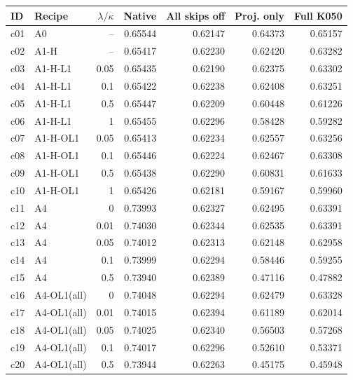 \begin{tabular}{@{}llrrrrr@{}}
\toprule
ID & Recipe & $\lambda/\kappa$ & Native & All skips off & Proj. only & Full K050 \\
\midrule
c01 & A0 & -- & 0.65544 & 0.62147 & 0.64373 & 0.65157 \\
\addlinespace[2pt]
c02 & A1-H & -- & 0.65417 & 0.62230 & 0.62420 & 0.63282 \\
\addlinespace[2pt]
c03 & A1-H-L1 & 0.05 & 0.65435 & 0.62190 & 0.62375 & 0.63302 \\
c04 & A1-H-L1 & 0.1 & 0.65422 & 0.62238 & 0.62408 & 0.63251 \\
c05 & A1-H-L1 & 0.5 & 0.65447 & 0.62209 & 0.60448 & 0.61226 \\
c06 & A1-H-L1 & 1 & 0.65455 & 0.62296 & 0.58428 & 0.59282 \\
\addlinespace[2pt]
c07 & A1-H-OL1 & 0.05 & 0.65413 & 0.62234 & 0.62557 & 0.63256 \\
c08 & A1-H-OL1 & 0.1 & 0.65446 & 0.62224 & 0.62467 & 0.63308 \\
c09 & A1-H-OL1 & 0.5 & 0.65438 & 0.62290 & 0.60831 & 0.61633 \\
c10 & A1-H-OL1 & 1 & 0.65426 & 0.62181 & 0.59167 & 0.59960 \\
\addlinespace[2pt]
c11 & A4 & 0 & 0.73993 & 0.62327 & 0.62495 & 0.63391 \\
c12 & A4 & 0.01 & 0.74030 & 0.62344 & 0.62535 & 0.63391 \\
c13 & A4 & 0.05 & 0.74012 & 0.62313 & 0.62148 & 0.62958 \\
c14 & A4 & 0.1 & 0.73999 & 0.62294 & 0.58446 & 0.59255 \\
c15 & A4 & 0.5 & 0.73940 & 0.62389 & 0.47116 & 0.47882 \\
\addlinespace[2pt]
c16 & A4-OL1(all) & 0 & 0.74048 & 0.62294 & 0.62479 & 0.63328 \\
c17 & A4-OL1(all) & 0.01 & 0.74015 & 0.62394 & 0.61189 & 0.62014 \\
c18 & A4-OL1(all) & 0.05 & 0.74025 & 0.62340 & 0.56503 & 0.57268 \\
c19 & A4-OL1(all) & 0.1 & 0.74017 & 0.62296 & 0.52610 & 0.53371 \\
c20 & A4-OL1(all) & 0.5 & 0.73944 & 0.62263 & 0.45175 & 0.45948 \\

\end{tabular}
